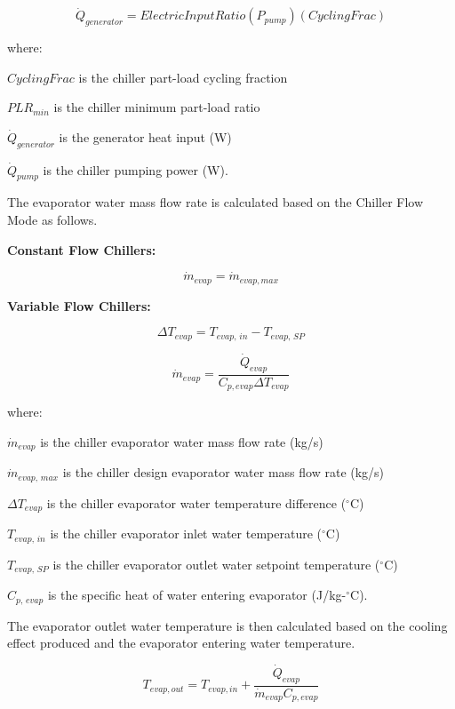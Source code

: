 \begin{equation}
{\dot Q_{generator}} = ElectricInputRatio({P_{pump}})(CyclingFrac)
\end{equation}

where:

\(CyclingFrac\) is the chiller part-load cycling fraction

\(PL{R_{min}}\) is the chiller minimum part-load ratio

\({\dot Q_{generator}}\) is the generator heat input (W)

\({\dot Q_{pump}}\) is the chiller pumping power (W).

The evaporator water mass flow rate is calculated based on the Chiller Flow Mode as follows.

\textbf{Constant Flow Chillers:}

\begin{equation}
{\dot m_{evap}} = {\dot m_{evap,max}}
\end{equation}

\textbf{Variable Flow Chillers:}

\begin{equation}
\Delta {T_{evap}} = {T_{evap,\,in}} - {T_{evap,\,SP}}
\end{equation}

\begin{equation}
  \dot m_{evap} = \frac{\dot{Q}_{evap}}{C_{p,evap}\Delta T_{evap}}
\end{equation}

where:

\({\dot m_{evap}}\) is the chiller evaporator water mass flow rate (kg/s)

\({\dot m_{evap,\,max}}\) is the chiller design evaporator water mass flow rate (kg/s)

\(\Delta {T_{evap}}\) is the chiller evaporator water temperature difference (\(^{\circ}\)C)

\({T_{evap,\,in}}\) is the chiller evaporator inlet water temperature (\(^{\circ}\)C)

\({T_{evap,\,SP}}\) is the chiller evaporator outlet water setpoint temperature (\(^{\circ}\)C)

\({C_{p,\,evap}}\) is the specific heat of water entering evaporator (J/kg-\(^{\circ}\)C).

The evaporator outlet water temperature is then calculated based on the cooling effect produced and the evaporator entering water temperature.

\begin{equation}
  T_{evap,out} = T_{evap,in} + \frac{\dot{Q}_{evap}}{\dot{m}_{evap}C_{p,evap}}
\end{equation}

